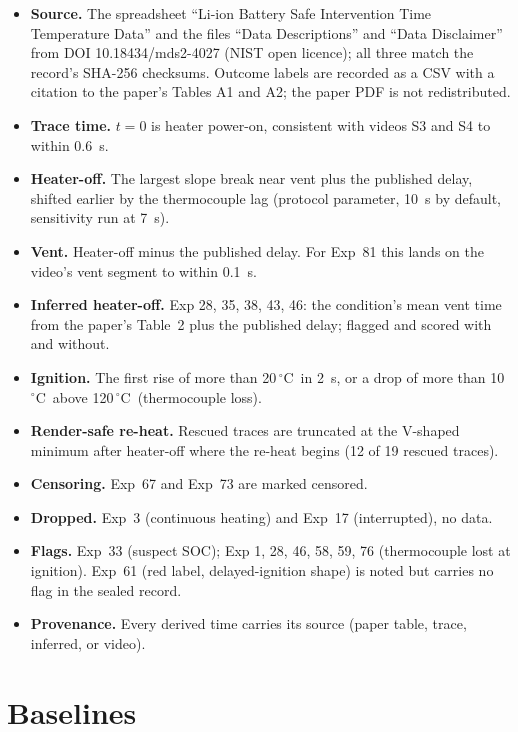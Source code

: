 \documentclass[11pt]{article}
\newcommand{\degC}{\,$^\circ$C}
\begin{document}
\begin{itemize}
  \item \textbf{Source.} The spreadsheet ``Li-ion Battery Safe Intervention Time Temperature Data'' and the files
  ``Data Descriptions'' and ``Data Disclaimer'' from DOI 10.18434/mds2-4027 (NIST open licence); all three match
  the record's SHA-256 checksums. Outcome labels are recorded as a CSV with a citation to the paper's Tables A1 and A2;
  the paper PDF is not redistributed.
  \item \textbf{Trace time.} $t = 0$ is heater power-on, consistent with videos S3 and S4 to within 0.6~s.
  \item \textbf{Heater-off.} The largest slope break near vent plus the published delay, shifted earlier by the
  thermocouple lag (protocol parameter, 10~s by default, sensitivity run at 7~s).
  \item \textbf{Vent.} Heater-off minus the published delay. For Exp~81 this lands on the video's vent segment to
  within 0.1~s.
  \item \textbf{Inferred heater-off.} Exp 28, 35, 38, 43, 46: the condition's mean vent time from the paper's Table~2
  plus the published delay; flagged and scored with and without.
  \item \textbf{Ignition.} The first rise of more than 20\degC\ in 2~s, or a drop of more than 10\degC\ above 120\degC\
  (thermocouple loss).
  \item \textbf{Render-safe re-heat.} Rescued traces are truncated at the V-shaped minimum after heater-off where the
  re-heat begins (12 of 19 rescued traces).
  \item \textbf{Censoring.} Exp~67 and Exp~73 are marked censored.
  \item \textbf{Dropped.} Exp~3 (continuous heating) and Exp~17 (interrupted), no data.
  \item \textbf{Flags.} Exp~33 (suspect SOC); Exp 1, 28, 46, 58, 59, 76 (thermocouple lost at ignition). Exp~61 (red
  label, delayed-ignition shape) is noted but carries no flag in the sealed record.
  \item \textbf{Provenance.} Every derived time carries its source (paper table, trace, inferred, or video).
\end{itemize}

\section{Baselines}\label{app:baselines}
\end{document}
